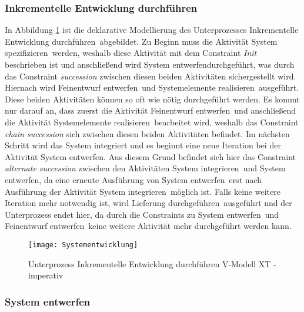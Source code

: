 {\subsubsection{Inkrementelle Entwicklung durchführen}
In Abbildung \ref{fig:Systementwicklung} ist die deklarative Modellierung des Unterprozesses \grqq Inkrementelle Entwicklung durchführen\grqq \ abgebildet. \newline
Zu Beginn muss die Aktivität \grqq System spezifizieren\grqq \ werden, weshalb diese Aktivität mit dem Constraint \textit{Init} beschrieben ist und anschließend wird \grqq System entwerfen\grqq durchgeführt, was durch das Constraint \textit{succession} zwischen diesen beiden Aktivitäten sichergestellt wird.\newline
Hiernach wird \grqq Feinentwurf entwerfen\grqq \ und \grqq Systemelemente realisieren\grqq \ ausgeführt. Diese beiden Aktivitäten können so oft wie nötig durchgeführt werden. Es kommt nur darauf an, dass zuerst die Aktivität \grqq Feinentwurf entwerfen\grqq \ und anschließend die Aktivität \grqq Systemelemente realisieren\grqq \ bearbeitet wird, weshalb das Constraint \textit{chain succession} sich zwischen diesen beiden Aktivitäten befindet. \newline
Im nächsten Schritt wird das System integriert und es beginnt eine neue Iteration bei der Aktivität \grqq System entwerfen\grqq. Aus diesem Grund befindet sich hier das Constraint \textit{alternate succession} zwischen den Aktivitäten \grqq System integrieren\grqq \ und \grqq System entwerfen\grqq, da eine erneute Ausführung von \grqq System entwerfen\grqq \ erst nach Ausführung der Aktivität \grqq System integrieren\grqq \ möglich ist. \newline
Falls keine weitere Iteration mehr notwendig ist, wird \grqq Lieferung durchgeführen\grqq \ ausgeführt und der Unterprozess endet hier, da durch die Constraints zu \grqq System entwerfen\grqq \ und \grqq Feinentwurf entwerfen\grqq \ keine weitere Aktivität mehr durchgeführt werden kann. \newline
\begin{figure}[!htbp]
\begin{center}
  \texttt{[image: Systementwicklung]} %
  \caption{Unterprozess Inkrementelle Entwicklung durchführen V-Modell XT - imperativ}
  \label{fig:Systementwicklung}
\end{center}
\end{figure}



\subsubsection{System entwerfen}


}
